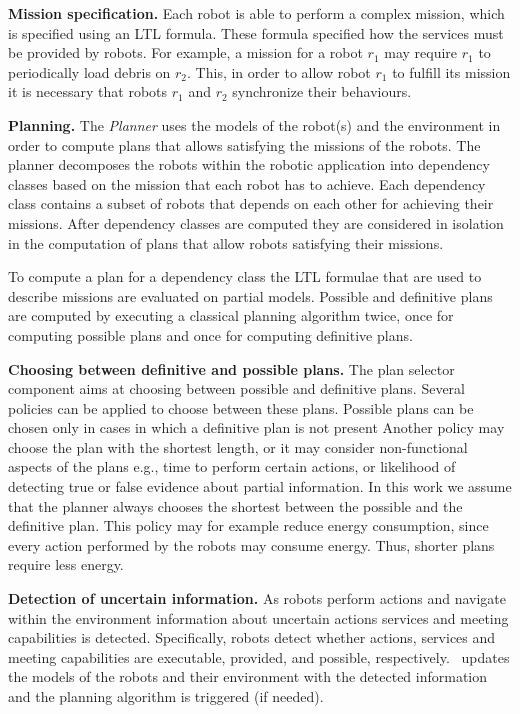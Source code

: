 \textbf{Mission specification.}
Each robot is able to perform a complex mission, which is specified using an LTL formula.
These formula specified how the services must be provided by robots.
For example, a mission for a robot $r_1$ may require $r_1$ to  periodically load debris on $r_2$.
This, in order to allow robot $r_1$ to fulfill its mission it is necessary that robots $r_1$ and $r_2$ synchronize their behaviours.





\textbf{Planning.} 
The \emph{Planner}  uses the models of the robot(s) and the environment in order to compute plans that allows satisfying the missions of the robots.
The planner decomposes the robots within the robotic application into dependency classes based on the mission that each robot has to achieve.
Each dependency class contains a subset of robots that depends on each other for achieving their missions.
After  dependency classes are computed they are considered in isolation in the computation of plans that allow robots satisfying their missions.

To compute a plan for a dependency class the  LTL formulae that are used to describe missions are evaluated on partial models.
Possible and definitive plans are computed by executing a classical planning algorithm twice, once for computing possible plans and once for computing definitive plans.



\textbf{Choosing between definitive and possible plans.}
The plan selector component aims at choosing between possible and definitive plans.
Several policies can be applied to choose between these plans.
Possible plans can be chosen only in cases in which a definitive plan is  not present 
Another policy may choose the plan with the shortest length, or it may consider non-functional aspects of the plans e.g., time to perform certain actions, or likelihood of detecting true or false evidence about partial information. 
In this work we assume  that the planner always chooses the shortest between the possible and the definitive plan.
This policy may for example reduce energy consumption, since every action performed by the robots may consume energy. 
Thus, shorter plans require less energy.

\textbf{Detection of uncertain information.}
As robots perform actions and navigate within the environment information about uncertain actions services and meeting capabilities is detected.
Specifically, robots detect whether actions, services and meeting capabilities are executable, provided, and possible, respectively.
\toolName\ updates the models of the robots and their environment with the detected information and the planning algorithm is triggered (if needed).







